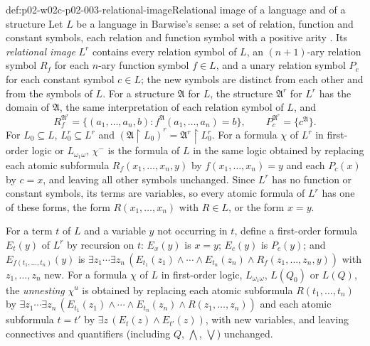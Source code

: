 \begin{hbdefinition}{def:p02-w02c-p02-003-relational-image}{Relational image of a language and of a structure}
Let \(L\) be a language in Barwise's sense: a set of relation, function and
constant symbols, each relation and function symbol with a positive arity
\cite[ch.~A.1, \S3, p.~17]{Barwise1977FirstOrder}.  Its \emph{relational
image} \(L^{r}\) contains every relation symbol of \(L\), an
\((n+1)\)-ary relation symbol \(R_f\) for each \(n\)-ary function symbol
\(f\in L\), and a unary relation symbol \(P_c\) for each constant symbol
\(c\in L\); the new symbols are distinct from each other and from the
symbols of \(L\).  For a structure \(\mathfrak A\) for \(L\), the structure
\(\mathfrak A^{r}\) for \(L^{r}\) has the domain of \(\mathfrak A\), the
same interpretation of each relation symbol of \(L\), and
\[
 R_f^{\mathfrak A^{r}}=\{(a_1,\ldots,a_n,b):f^{\mathfrak A}(a_1,\ldots,a_n)=b\},
 \qquad
 P_c^{\mathfrak A^{r}}=\{c^{\mathfrak A}\}.
\]
For \(L_0\subseteq L\), \(L_0^{r}\subseteq L^{r}\) and
\((\mathfrak A\restriction L_0)^{r}=\mathfrak A^{r}\restriction L_0^{r}\).
For a formula \(\chi\) of \(L^{r}\) in first-order logic or
\(L_{\omega_1\omega}\), \(\chi^{-}\) is the formula of \(L\) in the same
logic obtained by replacing each atomic subformula
\(R_f(x_1,\ldots,x_n,y)\) by \(f(x_1,\ldots,x_n)=y\) and each \(P_c(x)\) by
\(c=x\), and leaving all other symbols unchanged.  Since \(L^{r}\) has no
function or constant symbols, its terms are variables, so every atomic
formula of \(L^{r}\) has one of these forms, the form \(R(x_1,\ldots,x_n)\)
with \(R\in L\), or the form \(x=y\).
\end{hbdefinition}

For a term \(t\) of \(L\) and a variable \(y\) not occurring in \(t\),
define a first-order formula \(E_t(y)\) of \(L^{r}\) by recursion on
\(t\): \(E_x(y)\) is \(x=y\); \(E_c(y)\) is \(P_c(y)\); and
\(E_{f(t_1,\ldots,t_n)}(y)\) is
\(\exists z_1\cdots\exists z_n\,(E_{t_1}(z_1)\land\cdots\land
E_{t_n}(z_n)\land R_f(z_1,\ldots,z_n,y))\) with \(z_1,\ldots,z_n\) new.  For
a formula \(\chi\) of \(L\) in first-order logic, \(L_{\omega_1\omega}\),
\(L(Q_0)\) or \(L(Q)\), the \emph{unnesting} \(\chi^{u}\) is obtained by
replacing each atomic subformula \(R(t_1,\ldots,t_n)\) by
\(\exists z_1\cdots\exists z_n\,(E_{t_1}(z_1)\land\cdots\land
E_{t_n}(z_n)\land R(z_1,\ldots,z_n))\) and each atomic subformula \(t=t'\)
by \(\exists z\,(E_t(z)\land E_{t'}(z))\), with new variables, and leaving
connectives and quantifiers (including \(Q\), \(\bigwedge\), \(\bigvee\))
unchanged.

